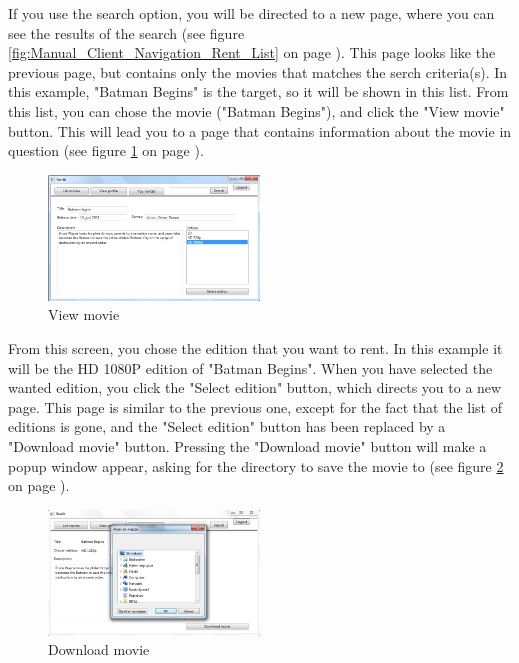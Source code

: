 If you use the search option, you will be directed to a new page, where you can see the results of the search (see figure \ref{fig:Manual_Client_Navigation_Rent_List} on page \pageref{fig:Manual_Client_Navigation_Rent_View}). This page looks like the previous page, but contains only the movies that matches the serch criteria(s). In this example, "Batman Begins" is the target, so it will be shown in this list. From this list, you can chose the movie ("Batman Begins"), and click the "View movie" button. This will lead you to a page that contains information about the movie in question (see figure \ref{fig:Manual_Client_Navigation_Rent_View} on page \pageref{fig:Manual_Client_Navigation_Rent_View}).

\begin{figure}[h!]  
  \centering
\includegraphics[width=0.5\textwidth]{Parts/Images/Manual/Viewmovie}
\caption{View movie}
\label{fig:Manual_Client_Navigation_Rent_View}
\end{figure}

From this screen, you chose the edition that you want to rent. In this example it will be the HD 1080P edition of "Batman Begins". When you have selected the wanted edition, you click the "Select edition" button, which directs you to a new page. This page is similar to the previous one, except for the fact that the list of editions is gone, and the "Select edition" button has been replaced by a "Download movie" button. Pressing the "Download movie" button will make a popup window appear, asking for the directory to save the movie to (see figure \ref{fig:Manual_Client_Navigation_Rent_Download} on page \pageref{fig:Manual_Client_Navigation_Rent_Download}).

\begin{figure}[h!]  
  \centering
\includegraphics[width=0.5\textwidth]{Parts/Images/Manual/Downloadmovie}
\caption{Download movie}
\label{fig:Manual_Client_Navigation_Rent_Download}
\end{figure}
 
